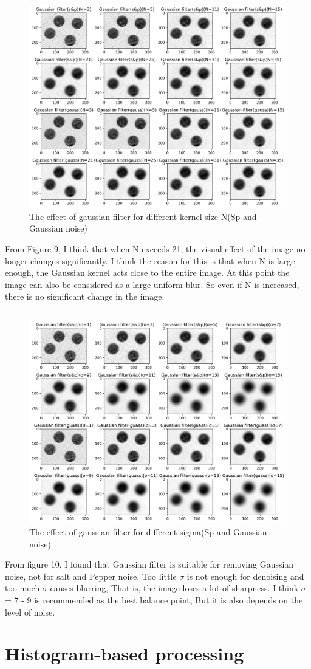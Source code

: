 \documentclass[12pt]{article}
\begin{document}
    \subsection{}  
    \begin{figure}[ht]
        \centering
            \includegraphics[width=0.7\columnwidth, keepaspectratio]{pics/a2-3.2}
        \caption[]{The effect of gaussian filter for different kernel size N(Sp and Gaussian noise)}
        \label{fig:3.4}
    \end{figure}
    From Figure 9, I think that when N exceeds 21, the visual effect of the image no longer changes significantly. I think the reason for this is that when N is large enough, the Gaussian kernel acts close to the entire image. At this point the image can also be considered as a large uniform blur. So even if N is increased, there is no significant change in the image.


    \subsection{}
    \begin{figure}[ht]
        \centering
            \includegraphics[width=0.7\columnwidth, keepaspectratio]{pics/a2-3.3}
        \caption[]{The effect of gaussian filter for different sigma(Sp and Gaussian noise)}
        \label{fig:3.5}
    \end{figure}
    From figure 10, I found that Gaussian filter is suitable for removing Gaussian noise, not for salt and Pepper noise. Too little $\sigma$ is not enough for denoising and too much $\sigma$ causes blurring, That is, the image loses a lot of sharpness. I think $\sigma$ = 7 - 9 is recommended as the best balance point, But it is also depends on the level of noise.
\section{Histogram-based processing}
\end{document}
